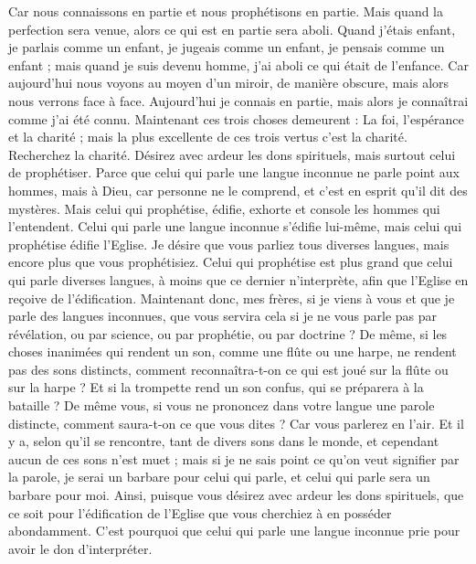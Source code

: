 \begin{multicols}{2}
Car nous connaissons en partie et nous prophétisons en partie.
Mais quand la perfection sera venue, alors ce qui est en partie sera aboli.
Quand j'étais enfant, je parlais comme un enfant, je jugeais comme un enfant, je pensais comme un enfant ; mais quand je suis devenu homme, j'ai aboli ce qui était de l'enfance.
Car aujourd'hui nous voyons au moyen d'un miroir, de manière obscure, mais alors nous verrons face à face. Aujourd'hui je connais en partie, mais alors je connaîtrai comme j'ai été connu.
Maintenant ces trois choses demeurent : La foi, l'espérance et la charité ; mais la plus excellente de ces trois vertus c'est la charité.
\VerseOne{}Recherchez la charité. Désirez avec ardeur les dons spirituels, mais surtout celui de prophétiser.
Parce que celui qui parle une langue inconnue ne parle point aux hommes, mais à Dieu, car personne ne le comprend, et c'est en esprit qu'il dit des mystères.
Mais celui qui prophétise, édifie, exhorte et console les hommes qui l'entendent.
Celui qui parle une langue inconnue s'édifie lui-même, mais celui qui prophétise édifie l'Eglise.
Je désire que vous parliez tous diverses langues, mais encore plus que vous prophétisiez. Celui qui prophétise est plus grand que celui qui parle diverses langues, à moins que ce dernier n'interprète, afin que l'Eglise en reçoive de l'édification.
Maintenant donc, mes frères, si je viens à vous et que je parle des langues inconnues, que vous servira cela si je ne vous parle pas par révélation, ou par science, ou par prophétie, ou par doctrine ?
De même, si les choses inanimées qui rendent un son, comme une flûte ou une harpe, ne rendent pas des sons distincts, comment reconnaîtra-t-on ce qui est joué sur la flûte ou sur la harpe ?
Et si la trompette rend un son confus, qui se préparera à la bataille ?
De même vous, si vous ne prononcez dans votre langue une parole distincte, comment saura-t-on ce que vous dites ? Car vous parlerez en l'air.
Et il y a, selon qu'il se rencontre, tant de divers sons dans le monde, et cependant aucun de ces sons n'est muet ;
mais si je ne sais point ce qu'on veut signifier par la parole, je serai un barbare pour celui qui parle, et celui qui parle sera un barbare pour moi.
Ainsi, puisque vous désirez avec ardeur les dons spirituels, que ce soit pour l'édification de l'Eglise que vous cherchiez à en posséder abondamment.
C'est pourquoi que celui qui parle une langue inconnue prie pour avoir le don d'interpréter.

\end{multicols}
